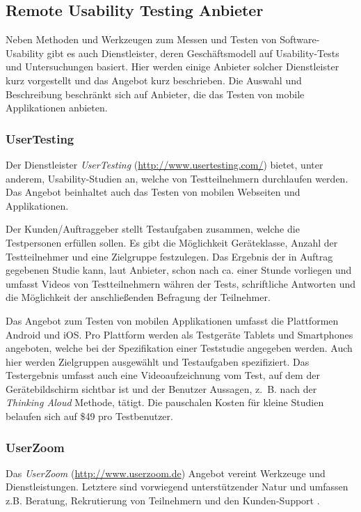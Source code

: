 \subsection{Remote Usability Testing Anbieter\label{subsec:usability_testing_anbieter}}
Neben Methoden und Werkzeugen zum Messen und Testen von Software-Usability gibt es auch Dienstleister, deren Geschäftsmodell auf Usability-Tests und Untersuchungen basiert.
Hier werden einige Anbieter solcher Dienstleister kurz vorgestellt und das Angebot kurz beschrieben.
Die Auswahl und Beschreibung beschränkt sich auf Anbieter, die das Testen von mobile Applikationen anbieten.

\subsubsection{UserTesting\label{subsubsec:usertesting}}
Der Dienstleister \emph{UserTesting} (\url{http://www.usertesting.com/}) bietet, unter anderem, Usability-Studien an, welche von Testteilnehmern durchlaufen werden.
Das Angebot beinhaltet auch das Testen von mobilen Webseiten und Applikationen. \cite[Vgl.][]{UserTesting.2014c}

Der Kunden/Auftraggeber stellt Testaufgaben zusammen, welche die Testpersonen erfüllen sollen.
Es gibt die Möglichkeit Geräteklasse, Anzahl der Testteilnehmer und eine Zielgruppe festzulegen.
Das Ergebnis der in Auftrag gegebenen Studie kann, laut Anbieter, schon nach ca. einer Stunde vorliegen und umfasst Videos von Testteilnehmern währen der Tests, schriftliche Antworten und die Möglichkeit der anschließenden Befragung der Teilnehmer. \cite[Vgl.][]{UserTesting.2014b}

Das Angebot zum Testen von mobilen Applikationen umfasst die Plattformen Android und iOS.
Pro Plattform werden als Testgeräte Tablets und Smartphones angeboten, welche bei der Spezifikation einer Teststudie angegeben werden. 
Auch hier werden Zielgruppen ausgewählt und Testaufgaben spezifiziert.
Das Testergebnis umfasst auch eine Videoaufzeichnung vom Test, auf dem der Gerätebildschirm sichtbar ist und der Benutzer Aussagen, z.~B. nach der \emph{Thinking Aloud} Methode, tätigt.
Die pauschalen Kosten für kleine Studien belaufen sich auf \$49 pro Testbenutzer.
\cite[Vgl.][]{UserTesting.2014}

\subsubsection{UserZoom \label{subsubsec:userzoom}}
Das \emph{UserZoom} (\url{http://www.userzoom.de}) Angebot vereint Werkzeuge und Dienstleistungen.
Letztere sind vorwiegend unterstützender Natur und umfassen z.B. Beratung, Rekrutierung von Teilnehmern und den Kunden-Support \cite[vgl.][]{UserZoomGmbH.2013b}.

